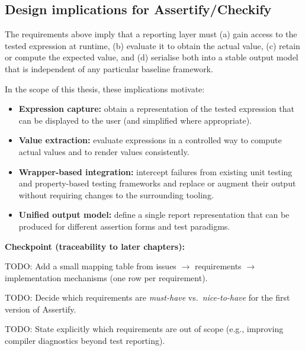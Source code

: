 \subsection{Design implications for Assertify/Checkify} %
     \label{Design implications for Assertify/Checkify} %


\begin{justify}
The requirements above imply that a reporting layer must (a) gain access to the tested expression at
runtime, (b) evaluate it to obtain the actual value, (c) retain or compute the expected value, and
(d) serialise both into a stable output model that is independent of any particular baseline
framework.

\skipM In the scope of this thesis, these implications motivate:

\skipS\begin{itemize}
    \item \textbf{Expression capture:} obtain a representation of the tested expression that can be
        displayed to the user (and simplified where appropriate).
    \item \textbf{Value extraction:} evaluate expressions in a controlled way to compute actual
        values and to render values consistently.
    \item \textbf{Wrapper-based integration:} intercept failures from existing unit testing and
        property-based testing frameworks and replace or augment their output without requiring
        changes to the surrounding tooling.
    \item \textbf{Unified output model:} define a single report representation that can be produced
        for different assertion forms and test paradigms.
\end{itemize}

\skipS\textbf{Checkpoint (traceability to later chapters):}

\begin{marker}[med]
    \item TODO: Add a small mapping table from issues $\to$ requirements $\to$ implementation
        mechanisms (one row per requirement).
    \item TODO: Decide which requirements are \emph{must-have} vs.\ \emph{nice-to-have} for the
        first version of Assertify.
    \item TODO: State explicitly which requirements are out of scope (e.g., improving compiler
        diagnostics beyond test reporting).
\end{marker}
\end{justify}



